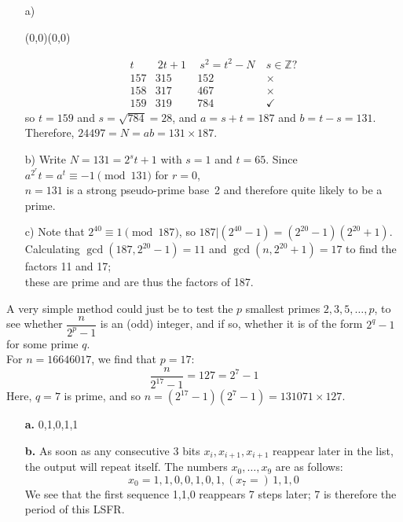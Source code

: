 \documentclass[11pt]{article}
\newcommand{\moveup}{\begin{picture}(0,0)(0,0)\end{picture}\vspace*{-8.15mm}}
\begin{document}
\bigskip{}
\begin{itemize}
  \item[a)]\moveup
    \[
      \begin{array}{cccc}
         t  &\  2t + 1 \ &\  s^2 = t^2 - N\ & s\in\mathbb{Z}\text{?} \\\hline
        157 &    315     &      152         & \times \\
        158 &    317     &      467         & \times \\
        159 &    319     &      784         & \checkmark
      \end{array}
    \]
    so  $t = 159$
    and $s = \sqrt{784} = 28$,
    and $a = s + t = 187$
    and $b = t - s = 131$.\\
    Therefore, $24497 = N = ab = 131\times 187$.
  \item[b)] Write  $N = 131 = 2^st+1$ with $s = 1$ and $t = 65$.
    Since %
    $a^{2^r}t = a^t \equiv -1\pmod{131}$ for $r = 0$,\\
    $n = 131$ is a strong pseudo-prime base~2
    and therefore quite likely to be a prime.
  \item[c)] Note that $2^{40}\equiv 1\pmod{187}$,
    so $187 | (2^{40} - 1) = (2^{20} - 1)(2^{20} + 1)$.\\
    Calculating $\gcd(187,2^{20} - 1) = 11$
    and $\gcd(n,2^{20} + 1) = 17$ to find the factors 11 and 17;\\
    these are prime and are thus the factors of 187.
\end{itemize}


\bigskip{}
A very simple method could just be to test the $p$ smallest primes $2,3,5,\ldots,p$,
to see whether $\dfrac{n}{2^p-1}$ is an (odd) integer, and if so, whether it is of the form $2^q-1$ for some prime $q$.\\
For $n = 16646017$, we find that $p = 17$: 
\[ 
  \frac{n}{2^{17}-1} = 127 = 2^7-1
\]
Here, $q = 7$ is prime, and so $n = (2^{17}-1)(2^7-1) = 131071 \times 127$.


\newpage{}
\begin{itemize}
  \item[{\bf a.}] 0,1,0,1,1
  \item[{\bf b.}] As soon as any consecutive 3 bits $x_i,x_{i+1},x_{i+1}$ reappear later in the list,
    the output will repeat itself.
    The numbers $x_0,\ldots,x_9$ are as follows:
    \[
      x_0 = 1, 1, 0, 0, 1, 0, 1, (x_7 =)\, 1, 1, 0
    \]
    We see that the first sequence 1,1,0 reappears 7 steps later;
    7 is therefore the period of this LSFR.
\end{itemize}
\end{document}
